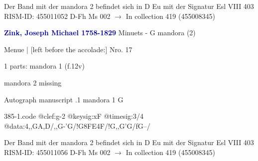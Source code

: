 \documentclass[twocolumn]{book}
\begin{document}
\newline Der Band mit der mandora 2 befindet sich in D Eu mit der Signatur Esl VIII 403
\newline RISM-ID: 455011052
\newline D-Fh  Ms 002
\newline $\rightarrow$ In collection 419 (455008345)
      
\newline \par \vspace{7pt} \textcolor{darkblue}{\textbf{Zink, Joseph Michael  1758-1829}}
\newline Minuets - G
\newline mandora (2)
\newline \begin{itshape}[f.12v, at left:] Menue | [left before the accolade:] Nro. 17\end{itshape} 
\newline \textcolor{darkblue}{}  1 parts: mandora 1  (f.12v)
\newline \begin{small} mandora 2 missing\end{small} 
\newline Autograph manuscript
.1  mandora 1  G  
\begin{filecontents*}{385-1.code}
@clef:g-2
@keysig:xF
@timesig:3/4
@data:4,,GA,D/,,G-'G/!G{8FE}4F/!G,,G'G/fG--/
\end{filecontents*}
\newline
%

\newline Der Band mit der mandora 2 befindet sich in D Eu mit der Signatur Esl VIII 403
\newline RISM-ID: 455011056
\newline D-Fh  Ms 002
\newline $\rightarrow$ In collection 419 (455008345)
      
\end{document}
